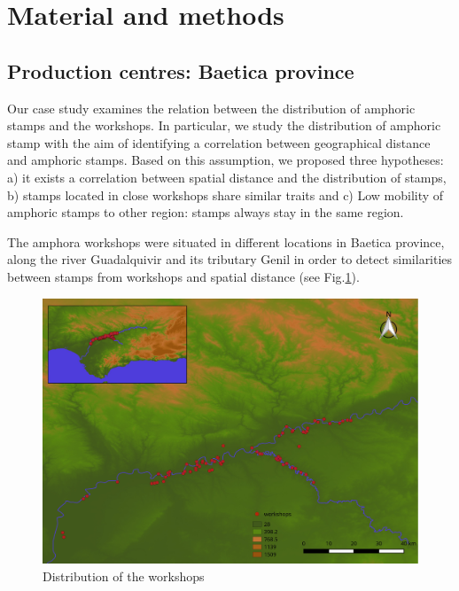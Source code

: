 \documentclass[review]{elsarticle}
\begin{document}


\section{Material and methods}

\subsection{Production centres: Baetica province}

Our case study examines the relation between the distribution of amphoric stamps and the workshops. In particular, we study the distribution of amphoric stamp with the aim of identifying a correlation between geographical distance and amphoric stamps. Based on this assumption, we proposed three hypotheses: a) it exists a correlation between spatial distance and the distribution of stamps, b) stamps located in close workshops share similar traits and c) Low mobility of amphoric stamps to other region: stamps always stay in the same region.  

The amphora workshops were situated in different locations in Baetica province, along the river Guadalquivir and its tributary Genil in order to detect similarities between stamps from workshops and spatial distance (see Fig.\ref{workshop}).

\begin{figure}[htp]
	\centering
\includegraphics[width=\linewidth]{figs/workshop}
\caption{Distribution of the workshops}
\label{workshop}
\end{figure} 
\end{document}
